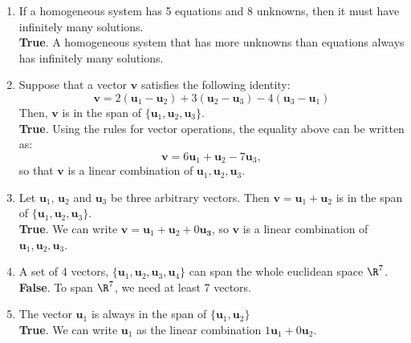 \documentclass[12pt]{article}
\begin{document}
\begin{enumerate}
\item If a homogeneous system has 5 equations and 8 unknowns, then it must have infinitely many solutions.\\
\textbf{True}. A homogeneous system that has more unknowns than equations always has infinitely many solutions.  

\item Suppose that a vector $\mathbf{v}$ satisfies the following identity:
\[
\mathbf{v} = 2(\mathbf{u}_1-\mathbf{u}_2) + 3(\mathbf{u}_2-\mathbf{u}_3) - 4(\mathbf{u}_3-\mathbf{u}_1)
\]
Then, $\mathbf{v}$ is in the span of $\{\mathbf{u}_1,\mathbf{u}_2,\mathbf{u}_3\}$.\\
\textbf{True}. Using the rules for vector operations, the equality above can be written as:
\[
\mathbf{v}=6\mathbf{u}_1+\mathbf{u}_2-7\mathbf{u}_3,
\]
so that $\mathbf{v}$ is a linear combination of $\mathbf{u}_1,\mathbf{u}_2,\mathbf{u}_3$.


\item Let $\mathbf{u}_1$, $\mathbf{u}_2$ and $\mathbf{u}_3$ be three arbitrary vectors. Then $\mathbf{v}=\mathbf{u}_1+\mathbf{u}_2$ is in the span of $\{\mathbf{u}_1, \mathbf{u}_2, \mathbf{u}_3\}$.\\
\textbf{True}. We can write $\mathbf{v}=\mathbf{u}_1+\mathbf{u}_2+0\mathbf{u_3}$, so $\mathbf{v}$ is a linear combination of $\mathbf{u}_1, \mathbf{u}_2, \mathbf{u}_3$.

\item A set of 4 vectors, $\{\mathbf{u}_1, \mathbf{u}_2, \mathbf{u}_3, \mathbf{u}_4\}$ can span the whole euclidean space $\R^7$.\\
\textbf{False}. To span $\R^7$, we need at least 7 vectors.

\item The vector $\mathbf{u}_1$ is always in the span of $\{\mathbf{u}_1, \mathbf{u}_2\}$\\
\textbf{True}. We can write $\mathbf{u}_1$ as the linear combination $1\mathbf{u}_1+0\mathbf{u}_2$.


\end{enumerate}
\end{document}
